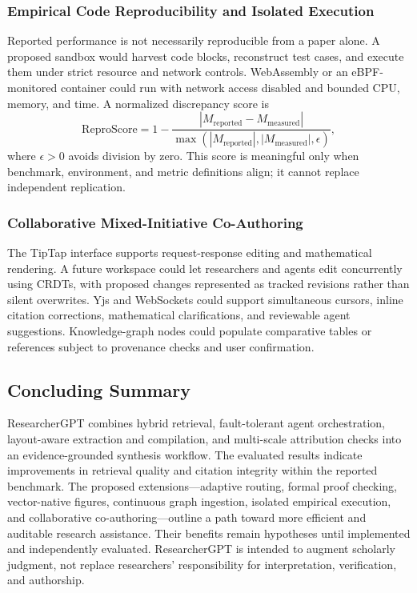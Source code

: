\documentclass[conference]{IEEEtran}
\begin{document}
\subsubsection{Empirical Code Reproducibility and Isolated Execution}
Reported performance is not necessarily reproducible from a paper alone. A proposed sandbox would harvest code blocks, reconstruct test cases, and execute them under strict resource and network controls.
WebAssembly or an eBPF-monitored container could run with network access disabled and bounded CPU, memory, and time. A normalized discrepancy score is
\begin{equation}\mathrm{ReproScore}=1-\frac{|M_{\mathrm{reported}}-M_{\mathrm{measured}}|}{\max(|M_{\mathrm{reported}}|,|M_{\mathrm{measured}}|,\epsilon)},\end{equation}
where $\epsilon>0$ avoids division by zero. This score is meaningful only when benchmark, environment, and metric definitions align; it cannot replace independent replication.
\subsubsection{Collaborative Mixed-Initiative Co-Authoring}
The TipTap interface supports request-response editing and mathematical rendering. A future workspace could let researchers and agents edit concurrently using CRDTs, with proposed changes represented as tracked revisions rather than silent overwrites.
Yjs and WebSockets could support simultaneous cursors, inline citation corrections, mathematical clarifications, and reviewable agent suggestions. Knowledge-graph nodes could populate comparative tables or references subject to provenance checks and user confirmation.
\subsection{Concluding Summary}
ResearcherGPT combines hybrid retrieval, fault-tolerant agent orchestration, layout-aware extraction and compilation, and multi-scale attribution checks into an evidence-grounded synthesis workflow. The evaluated results indicate improvements in retrieval quality and citation integrity within the reported benchmark. The proposed extensions---adaptive routing, formal proof checking, vector-native figures, continuous graph ingestion, isolated empirical execution, and collaborative co-authoring---outline a path toward more efficient and auditable research assistance. Their benefits remain hypotheses until implemented and independently evaluated. ResearcherGPT is intended to augment scholarly judgment, not replace researchers' responsibility for interpretation, verification, and authorship.
\clearpage
\end{document}
